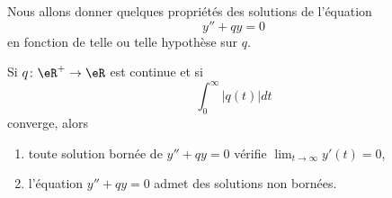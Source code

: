Nous allons donner quelques propriétés des solutions de l'équation
\begin{equation}
    y''+qy=0
\end{equation}
en fonction de telle ou telle hypothèse sur \( q\).

\begin{proposition}
    Si \( q\colon \eR^+\to \eR\) est continue et si
    \begin{equation}
        \int_0^{\infty}| q(t) |dt
    \end{equation}
    converge, alors
    \begin{enumerate}
        \item
            toute solution bornée de \( y''+qy=0\) vérifie \( \lim_{t\to \infty} y'(t)=0\),
        \item
            l'équation \( y''+qy=0\) admet des solutions non bornées.
    \end{enumerate}
\end{proposition}

